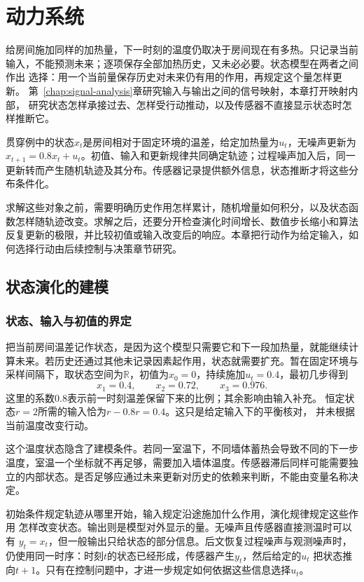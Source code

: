 \chapter{动力系统}
\label{chap:dynamical-systems-and-state-estimation}
\label{chap:action-and-state}

给房间施加同样的加热量，下一时刻的温度仍取决于房间现在有多热。只记录当前
输入，不能预测未来；逐项保存全部加热历史，又未必必要。状态模型在两者之间作出
选择：用一个当前量保存历史对未来仍有用的作用，再规定这个量怎样更新。
第~\ref{chap:signal-analysis}章研究输入与输出之间的信号映射，本章打开映射内部，
研究状态怎样承接过去、怎样受行动推动，以及传感器不直接显示状态时怎样推断它。

贯穿例中的状态\(x_t\)是房间相对于固定环境的温差，给定加热量为\(u_t\)，无噪声更新为\(x_{t+1}=0.8x_t+u_t\)。初值、输入和更新规律共同确定轨迹；过程噪声加入后，同一更新转而产生随机轨迹及其分布。传感器记录提供额外信息，状态推断才将这些分布条件化。

求解这些对象之前，需要明确历史作用怎样累计，随机增量如何积分，以及状态函数怎样随轨迹改变。求解之后，还要分开检查演化时间增长、数值步长缩小和算法反复更新的极限，并比较初值或输入改变后的响应。本章把行动作为给定输入，如何选择行动由后续控制与决策章节研究。

\section{状态演化的建模}
\label{sec:dynamical-difference-ode}

\subsection{状态、输入与初值的界定}
把当前房间温差记作状态，是因为这个模型只需要它和下一段加热量，就能继续计算未来。若历史还通过其他未记录因素起作用，状态就需要扩充。暂在固定环境与采样间隔下，取状态空间为$\mathbb R$，初值为$x_0=0$，持续施加$u_t=0.4$，最初几步得到
\[
  x_1=0.4,\qquad x_2=0.72,\qquad x_3=0.976.
\]
这里的系数$0.8$表示前一时刻温差保留下来的比例；其余影响由输入补充。
恒定状态$r=2$所需的输入恰为$r-0.8r=0.4$。这只是给定输入下的平衡核对，
并未根据当前温度改变行动。

这个温度状态隐含了建模条件。若同一室温下，不同墙体蓄热会导致不同的下一步温度，室温一个坐标就不再足够，需要加入墙体温度。传感器滞后同样可能需要独立的内部状态。是否足够应通过未来更新对历史的依赖来判断，不能由变量名称决定。

初始条件规定轨迹从哪里开始，输入规定沿途施加什么作用，演化规律规定这些作用
怎样改变状态。输出则是模型对外显示的量。无噪声且传感器直接测温时可以有
$y_t=x_t$，但一般输出只给状态的部分信息。后文恢复过程噪声与观测噪声时，
仍使用同一时序：时刻$t$的状态已经形成，传感器产生$y_t$，然后给定的$u_t$
把状态推向$t+1$。只有在控制问题中，才进一步规定如何依据这些信息选择$u_t$。

